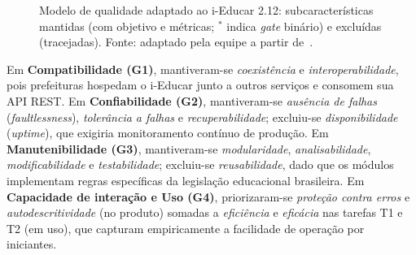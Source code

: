 \documentclass[conference]{model/IEEEtran}%
\begin{document}
\begin{figure}[!t]
\caption{Modelo de qualidade adaptado ao i-Educar 2.12: subcaracterísticas mantidas (com objetivo e métricas; $^*$ indica \textit{gate} binário) e excluídas (tracejadas). Fonte: adaptado pela equipe a partir de~\cite{iso25010,iso25019}.}
\label{fig:modelo}
\end{figure}

Em \textbf{Compatibilidade (G1)}, mantiveram-se \textit{coexistência} e \textit{interoperabilidade}, pois prefeituras hospedam o i-Educar junto a outros serviços e consomem sua API REST. Em \textbf{Confiabilidade (G2)}, mantiveram-se \textit{ausência de falhas} (\textit{faultlessness}), \textit{tolerância a falhas} e \textit{recuperabilidade}; excluiu-se \textit{disponibilidade} (\textit{uptime}), que exigiria monitoramento contínuo de produção. Em \textbf{Manutenibilidade (G3)}, mantiveram-se \textit{modularidade}, \textit{analisabilidade}, \textit{modificabilidade} e \textit{testabilidade}; excluiu-se \textit{reusabilidade}, dado que os módulos implementam regras específicas da legislação educacional brasileira. Em \textbf{Capacidade de interação e Uso (G4)}, priorizaram-se \textit{proteção contra erros} e \textit{autodescritividade} (no produto) somadas a \textit{eficiência} e \textit{eficácia} nas tarefas T1 e T2 (em uso), que capturam empiricamente a facilidade de operação por iniciantes.
\end{document}
